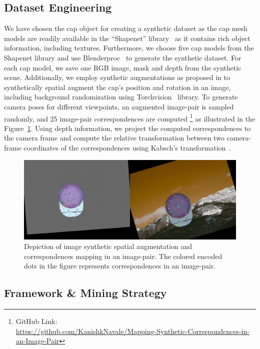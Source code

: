 \subsection{Dataset Engineering}

We have chosen the cap object for creating a synthetic dataset as the cap mesh models are readily available in the ``Shapenet''
library~\cite{chang2015shapenet} as it contains rich object information, including textures.
Furthermore, we choose five cap models from the Shapenet library and use Blenderproc~\cite{blenderproc}
to generate the synthetic dataset. For each cap model, we save one RGB image, mask and depth from the synthetic scene.
Additionally, we employ synthetic augmentations as proposed in \cite{adrian2022efficient} to synthetically
spatial augment the cap's position and rotation in an image, including background randomization
using Torchvision~\cite{marcel2010torchvision} library. To generate camera poses for different viewpoints,
an augmented image-pair is sampled randomly, and 25 image-pair correspondences are computed
\footnote[1]{GitHub Link: \\ \url{https://github.com/KanishkNavale/Mapping-Synthetic-Correspondences-in-an-Image-Pair}}
as illustrated in the Figure~\ref{fig:image_augs}. Using depth information,
we project the computed correspondences to the camera frame and compute the relative transformation between
two camera-frame coordinates of the correspondences using Kabsch's transformation~\cite{kabsch}.

\begin{figure}[htb]
    \centering
    \includegraphics[scale=0.2]{images/debug_correspondences.png}
    \caption{Depiction of image synthetic spatial augmentation and correspondences mapping in an image-pair. The colored encoded dots in the figure represents correspondences in an image-pair.}
    \label{fig:image_augs}
\end{figure}

\subsection{Framework \& Mining Strategy}


